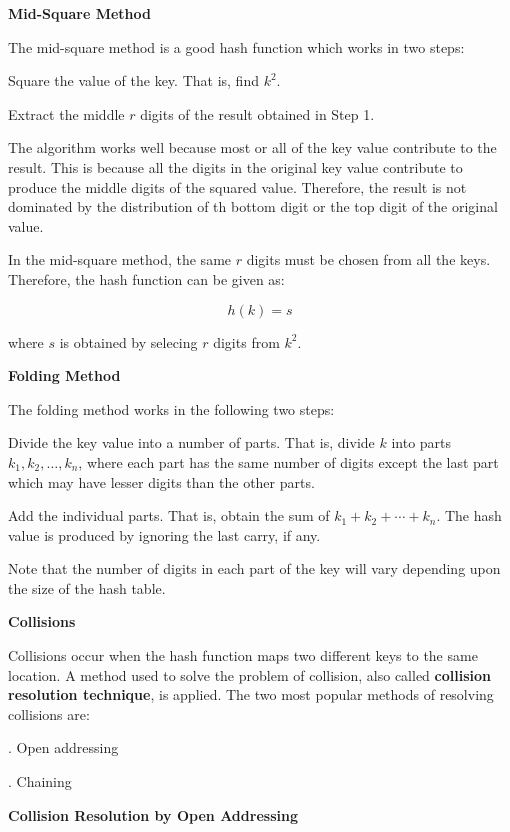 \filbreak
\vskip 1cm
{\bf Mid-Square Method}

\vskip 1mm

The mid-square method is a good hash function which works in two steps:

\vskip 3mm
 Square the value of the key. That is, find $k^2$.

\vskip 3mm
 Extract the middle $r$ digits of the result obtained in Step 1.

\vskip 1mm
The algorithm works well because most or all of the key value contribute to the result. This is because all the digits in the original key value contribute to produce the middle digits of the squared value. Therefore, the result is not dominated by the distribution of th bottom digit or the top digit of the original value.

\vskip 1mm
In the mid-square method, the same $r$ digits must be chosen from all the keys. Therefore, the hash function can be given as:

$$h(k)=s$$

where $s$ is obtained by selecing $r$ digits from $k^2$.

\filbreak
\vskip 1cm
{\bf Folding Method}

\vskip 1mm
The folding method works in the following two steps:

\vskip 3mm
 Divide the key value into a number of parts. That is, divide $k$ into parts $k_1,k_2,\ldots,k_n$, where each part has the same number of digits except the last part which may have lesser digits than the other parts.

\vskip 3mm
 Add the individual parts. That is, obtain the sum of $k_1+k_2+\cdots+k_n$. The hash value is produced by ignoring the last carry, if any.

\vskip 1mm
Note that the number of digits in each part of the key will vary depending upon the size of the hash table.

\filbreak
\vskip 1cm
{\bf Collisions}

\vskip 1mm
Collisions occur when the hash function maps two different keys to the same location. A method used to solve the problem of collision, also called {\bf collision resolution technique}, is applied. The two most popular methods of resolving collisions are:

\vskip 3mm
. Open addressing

\vskip 3mm
. Chaining

\filbreak
\vskip 1cm
{\bf Collision Resolution by Open Addressing}

